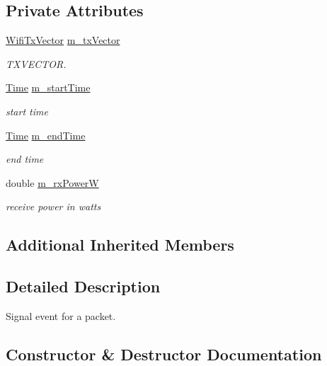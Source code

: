 \subsection*{Private Attributes}
\begin{DoxyCompactItemize}
\item 
\hyperlink{classns3_1_1WifiTxVector}{Wifi\+Tx\+Vector} \hyperlink{classns3_1_1InterferenceHelper_1_1Event_aeb106f4c0bf92fdd733d6d2f31c8a9e7}{m\+\_\+tx\+Vector}
\begin{DoxyCompactList}\small\item\em T\+X\+V\+E\+C\+T\+OR. \end{DoxyCompactList}\item 
\hyperlink{classns3_1_1Time}{Time} \hyperlink{classns3_1_1InterferenceHelper_1_1Event_ad7060eef55c9209a0a9e33f3d91af473}{m\+\_\+start\+Time}
\begin{DoxyCompactList}\small\item\em start time \end{DoxyCompactList}\item 
\hyperlink{classns3_1_1Time}{Time} \hyperlink{classns3_1_1InterferenceHelper_1_1Event_aa801d0ca323daf47c44c42f9566f9ce8}{m\+\_\+end\+Time}
\begin{DoxyCompactList}\small\item\em end time \end{DoxyCompactList}\item 
double \hyperlink{classns3_1_1InterferenceHelper_1_1Event_adc699d4d74ed01433a53b8cef700e0fb}{m\+\_\+rx\+PowerW}
\begin{DoxyCompactList}\small\item\em receive power in watts \end{DoxyCompactList}\end{DoxyCompactItemize}
\subsection*{Additional Inherited Members}


\subsection{Detailed Description}
Signal event for a packet. 

\subsection{Constructor \& Destructor Documentation}
